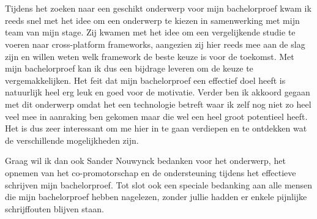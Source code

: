 
\chapter*{}
\label{ch:voorwoord}


Tijdens het zoeken naar een geschikt onderwerp voor mijn bachelorproef kwam ik reeds snel met het idee om een onderwerp te kiezen in samenwerking met mijn team van mijn stage. Zij kwamen met het idee om een vergelijkende studie te voeren naar cross-platform frameworks, aangezien zij hier reeds mee aan de slag zijn en willen weten welk framework de beste keuze is voor de toekomst. Met mijn bachelorproef kan ik dus een bijdrage leveren om de keuze te vergemakkelijken. Het feit dat mijn bachelorproef een effectief doel heeft is natuurlijk heel erg leuk en goed voor de motivatie. Verder ben ik akkoord gegaan met dit onderwerp omdat het een technologie betreft waar ik zelf nog niet zo heel veel mee in aanraking ben gekomen maar die wel een heel groot potentieel heeft. Het is dus zeer interessant om me hier in te gaan verdiepen en te ontdekken wat de verschillende mogelijkheden zijn.

Graag wil ik dan ook Sander Nouwynck bedanken voor het onderwerp, het opnemen van het co-promotorschap en de ondersteuning tijdens het effectieve schrijven mijn bachelorproef. Tot slot ook een speciale bedanking aan alle mensen die mijn bachelorproef hebben nagelezen, zonder jullie hadden er enkele pijnlijke schrijffouten blijven staan.